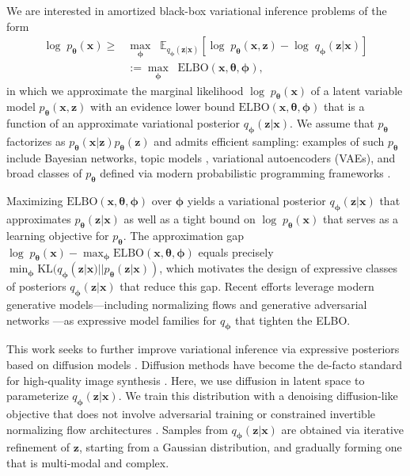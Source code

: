 \documentclass[letterpaper]{article} %
\newcommand{\bx}{\mathbf{x}}
\newcommand{\bz}{\mathbf{z}}
\newcommand\Exp{\mathbb{E}}
\let\oldtheta\theta
\renewcommand{\theta}{{\boldsymbol \oldtheta}}
\let\oldphi\phi
\renewcommand{\phi}{{\boldsymbol \oldphi}}
\begin{document}
We are interested in amortized black-box variational inference 
problems of the form
\begin{align}
    \log\; p_\theta(\bx) \geq &\max_\phi \;\; \Exp_{q_\phi(\bz|\bx)} \left[ \log \; p_\theta(\bx, \bz) - \log\; q_\phi(\bz|\bx) \right] \nonumber \\ 
    &:= \max_\phi \;\; \text{ELBO}(\bx, \theta, \phi), 
\end{align}
in which we approximate the marginal likelihood $\log\; p_\theta(\bx)$ of a latent variable model $p_\theta(\bx, \bz)$ with an evidence lower bound $\text{ELBO}(\bx, \theta, \phi)$ that is a function of an approximate variational posterior $q_\phi (\bz|\bx)$.
We assume that $p_\theta$ factorizes as $p_\theta(\bx|\bz)p_\theta(\bz)$ and admits efficient sampling: examples of such $p_\theta$ include Bayesian networks, topic models \cite{blei2003latent}, variational autoencoders (VAEs), and broad classes of $p_\theta$ defined via modern probabilistic programming frameworks \cite{gordon2014probabilistic}.

Maximizing $\text{ELBO}(\bx, \theta, \phi)$ over $\phi$ yields a variational posterior $q_\phi(\bz|\bx)$ that approximates $p_\theta(\bz|\bx)$ as well as a tight bound on $\log\; p_\theta(\bx)$ that serves as a learning objective for $p_\theta$.
The approximation gap $\log\; p_\theta(\bx) - \max_\phi \text{ELBO}(\bx, \theta, \phi)$ equals precisely $\min_\phi \text{KL}(q_\phi(\bz|\bx) || p_\theta(\bz|\bx))$, which motivates the design of expressive classes of posteriors $q_\phi(\bz|\bx)$ that reduce this gap.
Recent efforts %
leverage modern generative models---including normalizing flows \citep{rezende2015variational,kingma2016improved} and generative adversarial networks \citep{goodfellow2014generative,makhzani2015adversarial}---as expressive model families for $q_\phi$ that tighten the ELBO.

This work seeks to further improve variational inference via expressive posteriors based on diffusion models
\citep{ho2020denoising, song2020score}.
Diffusion methods have become 
the de-facto standard for high-quality image synthesis \citep{rombach2022high,gokaslan2024commoncanvas}.
Here, we use diffusion in latent space to parameterize $q_\phi(\bz|\bx)$.
We train this distribution with a denoising diffusion-like objective that does not involve adversarial training \citep{makhzani2015adversarial} or constrained invertible normalizing flow architectures \citep{kingma2016improved}. Samples from $q_\phi(\bz|\bx)$ are obtained via iterative refinement of $\bz$, starting from a Gaussian distribution, and gradually forming one that is multi-modal and complex.
\end{document}

